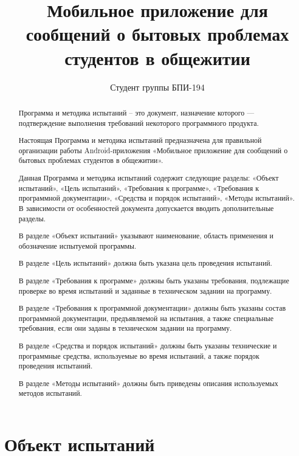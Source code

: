 \documentclass{../includes/TechDoc}
\title{Мобильное приложение для сообщений о бытовых проблемах студентов в общежитии}
\author{Студент группы БПИ-194}{В. А. Анненков}
\begin{document}
    \maketitle

    \begin{abstract}
        Программа и методика испытаний – это документ, назначение которого — подтверждение выполнения требований некоторого программного продукта.

        Настоящая Программа и методика испытаний предназначена для правильной организации работы Android-приложения «Мобильное приложение для сообщений о бытовых проблемах студентов в общежитии».

        Данная Программа и методика испытаний содержит следующие разделы: «Объект испытаний», «Цель испытаний», «Требования к программе», «Требования к программной документации», «Средства и порядок испытаний», «Методы испытаний». В зависимости от особенностей документа допускается вводить дополнительные разделы.

        В разделе «Объект испытаний» указывают наименование, область применения и обозначение испытуемой программы.

        В разделе «Цель испытаний» должна быть указана цель проведения испытаний.

        В разделе «Требования к программе» должны быть указаны требования, подлежащие проверке во время испытаний и заданные в техническом задании на программу.

        В разделе «Требования к программной документации» должны быть указаны состав программной документации, предъявляемой на испытания, а также специальные требования, если они заданы в техническом задании на программу.

        В разделе «Средства и порядок испытаний» должны быть указаны технические и программные средства, используемые во время испытаний, а также порядок проведения испытаний.

        В разделе «Методы испытаний» должны быть приведены описания используемых методов испытаний.

    \end{abstract}

    \newpage

    \tableofcontents


    \section{Объект испытаний}
\end{document}
